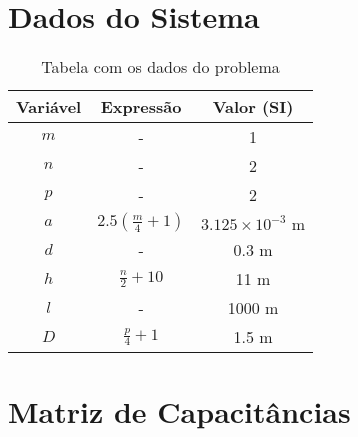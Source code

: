 \documentclass{aleph-revista}
\begin{document}
\membrete

\vspace{1em}

\section{Dados do Sistema}

\begin{table}[!h]
  \centering
  \caption{Tabela com os dados do problema}
  \label{tab:dados}
  \begin{tabular}{ccc}
    \toprule
    Variável & Expressão                                       &
    Valor (SI)                                                                                  \\
    \midrule
    $m$      & -                                               & 1                              \\
    $n$      & -                                               & 2                              \\
    $p$      & -                                               & 2                              \\
    $a$      & $\displaystyle 2.5\left( \frac{m}{4}+1 \right)$ & $3.125\times10^{-3} \text{ m}$ \\
    $d$      & -                                               & 0.3 m                          \\
    $h$      & $\displaystyle \frac{n}{2} + 10$                & 11 m                           \\
    $l$      & -                                               & 1000 m                         \\
    $D$      & $\displaystyle \frac{p}{4}+1$                   & 1.5 m                          \\
    \bottomrule
  \end{tabular}
\end{table}

\section{Matriz de Capacitâncias}
\end{document}
